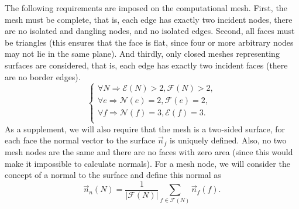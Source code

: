 \documentclass[
11pt,%
tightenlines,%
twoside,%
onecolumn,%
nofloats,%
nobibnotes,%
nofootinbib,%
superscriptaddress,%
noshowpacs,%
centertags]%
{revtex4-2}
\begin{document}
The following requirements are imposed on the computational mesh.
First, the mesh must be complete, that is, each edge has exactly two incident nodes, there are no isolated and dangling nodes, and no isolated edges.
Second, all faces must be triangles (this ensures that the face is flat, since four or more arbitrary nodes may not lie in the same plane).
And thirdly, only closed meshes representing  surfaces are
considered, that is, each edge has exactly two incident faces (there
are no border edges).
\begin{equation}\label{eq_arch}
\begin{cases}
\forall N \Rightarrow \mathscr{E}(N) > 2, \mathscr{F}(N) > 2, \\
\forall e \Rightarrow \mathscr{N}(e) = 2 , \mathscr{F}(e) = 2, \\
\forall f \Rightarrow \mathscr{N}(f) = 3 , \mathscr{E}(f) = 3. \\
\end{cases}
\end{equation}
As a supplement, we will also require that the mesh is a two-sided surface, for each face the normal vector to the surface $\vec{n}_f$ is uniquely defined.
Also, no two mesh nodes are the same and there are no faces with zero area (since this would make it impossible to calculate normals).
For a mesh node, we will consider the concept of a normal to the surface and define this normal as
\begin{equation}
\vec{n}_n(N) = \frac{1}{|\mathscr{F}(N)|} \sum_{f \in
\mathscr{F}(N)}{\vec{n}_f(f)}.
\end{equation}
\end{document}
